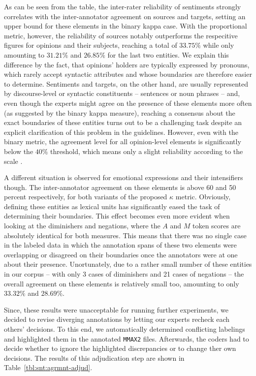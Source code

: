 As can be seen from the table, the inter-rater reliability of
sentiments strongly correlates with the inter-annotator agreement on
sources and targets, setting an upper bound for these elements in the
binary kappa case.  With the proportional metric, however, the
reliability of sources notably outperforms the respecitive figures for
opinions and their subjects, reaching a total of $33.75\%$ while only
amounting to $31.21\%$ and $26.85\%$ for the last two entities.  We
explain this difference by the fact, that opinions' holders are
typically expressed by pronouns, which rarely accept syntactic
attributes and whose boundaries are therefore easier to determine.
Sentiments and targets, on the other hand, are usually represented by
discourse-level or syntactic constituents -- sentences or noun phrases
-- and, even though the experts might agree on the presence of these
elements more often (as suggested by the binary kappa measure),
reaching a consensus about the exact boundaries of these entities
turns out to be a challenging task despite an explicit clarification
of this problem in the guidelines.  However, even with the binary
metric, the agreement level for all opinion-level elements is
significantly below the $40\%$ threshold, which means only a slight
reliability according to the \citeauthor{Landis:77} scale
\cite{Landis:77}.

A different situation is observed for emotional expressions and their
intensifiers though.  The inter-annotator agreement on these elements
is above 60 and 50 percent respectively, for both variants of the
proposed $\kappa$ metric.  Obviously, defining these entities as
lexical units has significantly eased the task of determining their
boundaries.  This effect becomes even more evident when looking at the
diminishers and negations, where the $A$ and $M$ token scores are
absolutely identical for both measures.  This means that there was no
single case in the labeled data in which the annotation spans of these
two elements were overlapping or disagreed on their boundaries once
the annotators were at one about their presence.  Unortunately, due to
a rather small number of these entities in our corpus -- with only 3
cases of diminishers and 21 cases of negations -- the overall
agreement on these elements is relatively small too, amounting to only
$33.32\%$ and $28.69\%$.

Since, these results were unacceptable for running further
experiments, we decided to revise diverging annotations by letting our
experts recheck each others' decisions.  To this end, we automatically
determined conflicting labelings and highlighted them in the annotated
\texttt{MMAX2} files.  Afterwards, the coders had to decide whether to
ignore the highlighted discrepancies or to change ther own decisions.
The results of this adjudication step are shown in
Table~\ref{tbl:snt:agrmnt-adjud}.

